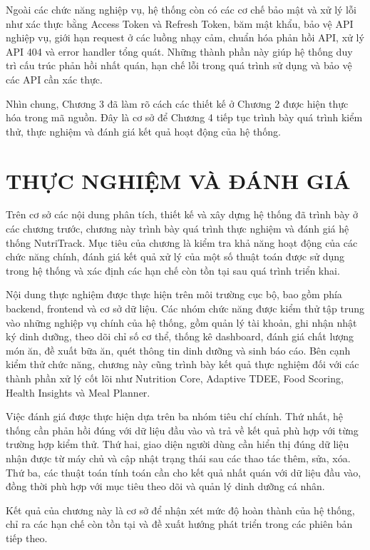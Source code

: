 \documentclass[12pt, a4paper]{report}
\begin{document}
Ngoài các chức năng nghiệp vụ, hệ thống còn có các cơ chế bảo mật và xử lý lỗi như xác thực bằng Access Token và Refresh Token, băm mật khẩu, bảo vệ API nghiệp vụ, giới hạn request ở các luồng nhạy cảm, chuẩn hóa phản hồi API, xử lý API 404 và error handler tổng quát. Những thành phần này giúp hệ thống duy trì cấu trúc phản hồi nhất quán, hạn chế lỗi trong quá trình sử dụng và bảo vệ các API cần xác thực.

Nhìn chung, Chương 3 đã làm rõ cách các thiết kế ở Chương 2 được hiện thực hóa trong mã nguồn. Đây là cơ sở để Chương 4 tiếp tục trình bày quá trình kiểm thử, thực nghiệm và đánh giá kết quả hoạt động của hệ thống.

\chapter{THỰC NGHIỆM VÀ ĐÁNH GIÁ}
Trên cơ sở các nội dung phân tích, thiết kế và xây dựng hệ thống đã trình bày ở các chương trước, chương này trình bày quá trình thực nghiệm và đánh giá hệ thống NutriTrack. Mục tiêu của chương là kiểm tra khả năng hoạt động của các chức năng chính, đánh giá kết quả xử lý của một số thuật toán được sử dụng trong hệ thống và xác định các hạn chế còn tồn tại sau quá trình triển khai.

Nội dung thực nghiệm được thực hiện trên môi trường cục bộ, bao gồm phía backend, frontend và cơ sở dữ liệu. Các nhóm chức năng được kiểm thử tập trung vào những nghiệp vụ chính của hệ thống, gồm quản lý tài khoản, ghi nhận nhật ký dinh dưỡng, theo dõi chỉ số cơ thể, thống kê dashboard, đánh giá chất lượng món ăn, đề xuất bữa ăn, quét thông tin dinh dưỡng và sinh báo cáo. Bên cạnh kiểm thử chức năng, chương này cũng trình bày kết quả thực nghiệm đối với các thành phần xử lý cốt lõi như Nutrition Core, Adaptive TDEE, Food Scoring, Health Insights và Meal Planner.

Việc đánh giá được thực hiện dựa trên ba nhóm tiêu chí chính. Thứ nhất, hệ thống cần phản hồi đúng với dữ liệu đầu vào và trả về kết quả phù hợp với từng trường hợp kiểm thử. Thứ hai, giao diện người dùng cần hiển thị đúng dữ liệu nhận được từ máy chủ và cập nhật trạng thái sau các thao tác thêm, sửa, xóa. Thứ ba, các thuật toán tính toán cần cho kết quả nhất quán với dữ liệu đầu vào, đồng thời phù hợp với mục tiêu theo dõi và quản lý dinh dưỡng cá nhân.

Kết quả của chương này là cơ sở để nhận xét mức độ hoàn thành của hệ thống, chỉ ra các hạn chế còn tồn tại và đề xuất hướng phát triển trong các phiên bản tiếp theo.
\end{document}
